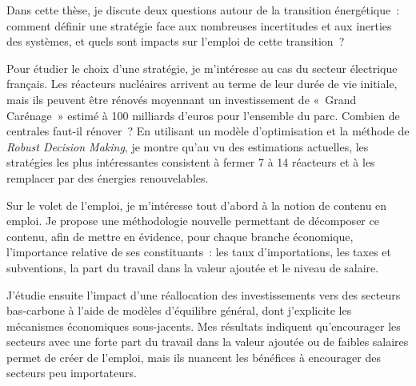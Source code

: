 Dans cette thèse, je discute deux questions autour de la transition énergétique : comment définir une stratégie face aux nombreuses incertitudes et aux inerties des systèmes, et quels sont impacts sur l’emploi de cette transition ?

Pour étudier le choix d’une stratégie, je m’intéresse au cas du secteur électrique français. Les réacteurs nucléaires arrivent au terme de leur durée de vie initiale, mais ils peuvent être rénovés moyennant un investissement de « Grand Carénage » estimé à 100 milliards d'euros pour l'ensemble du parc. Combien de centrales faut-il rénover ? En utilisant un modèle d'optimisation et la méthode de \textit{Robust Decision Making}, je montre qu’au vu des estimations actuelles, les stratégies les plus intéressantes consistent à fermer 7 à 14 réacteurs et à les remplacer par des énergies renouvelables.

Sur le volet de l’emploi, je m’intéresse tout d’abord à la notion de contenu en emploi. Je propose une méthodologie nouvelle permettant de décomposer ce contenu, afin de mettre en évidence, pour chaque branche économique, l’importance relative de ses constituants : les taux d’importations, les taxes et subventions, la part du travail dans la valeur ajoutée et le niveau de salaire. 

J'étudie ensuite l’impact d’une réallocation des investissements vers des secteurs bas-carbone à l'aide de modèles d'équilibre général, dont j'explicite les mécanismes économiques sous-jacents.
Mes résultats indiquent qu'encourager les secteurs avec une forte part du travail dans la valeur ajoutée ou de faibles salaires permet de créer de l'emploi, mais ils nuancent les bénéfices à encourager des secteurs peu importateurs.
